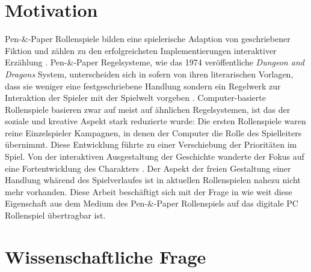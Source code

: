 

\section{Motivation}
\label{sec:Motivation}

Pen-\&-Paper Rollenspiele bilden eine spielerische Adaption von geschriebener Fiktion und zählen zu den erfolgreichsten Implementierungen interaktiver Erzählung \cite{Tychsen2006}. Pen-\&-Paper Regelsysteme, wie das 1974 veröffentliche \emph{Dungeon and Dragons} System, unterscheiden sich in sofern von ihren literarischen Vorlagen, dass sie weniger eine festgeschriebene Handlung sondern ein Regelwerk zur Interaktion der Spieler mit der Spielwelt vorgeben \cite{Apperley2006}. Computer-basierte Rollenspiele basieren zwar auf meist auf ähnlichen Regelsystemen, ist das der soziale und kreative Aspekt stark reduzierte wurde: Die ersten Rollenspiele waren reine Einzelspieler Kampagnen, in denen der Computer die Rolle des Spielleiters übernimmt\cite{Apperley2006}. Diese Entwicklung führte zu einer Verschiebung der Prioritäten im Spiel. Von der interaktiven Ausgestaltung der Geschichte wanderte der Fokus auf eine Fortentwicklung des Charakters . Der Aspekt der freien Gestaltung einer Handlung whärend des Spielverlaufes ist in aktuellen Rollenspielen nahezu nicht mehr vorhanden. Diese Arbeit beschäftigt sich mit der Frage in wie weit diese Eigenschaft aus dem Medium des Pen-\&-Paper Rollenspiels auf das digitale PC Rollenspiel übertragbar ist.

\section{Wissenschaftliche Frage}
\label{sec:WissenschaftlicheFrage}

